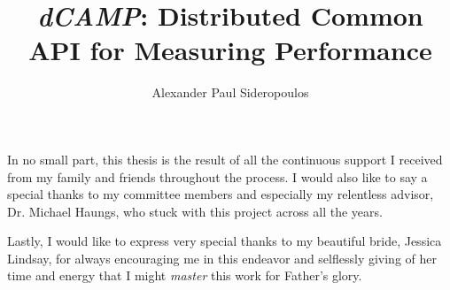 \documentclass[12pt]{ucthesis}
\newcommand{\dcampns}{\emph{dCAMP}}
\begin{document}

\title{\dcampns: Distributed Common API for Measuring Performance}
\author{Alexander Paul Sideropoulos}
  
 
     

\maketitle

\begin{frontmatter}

\copyrightpage

\committeemembershippage



\begin{acknowledgements}

In no small part, this thesis is the result of all the continuous support I received from my family and friends
throughout the process. I would also like to say a special thanks to my committee members and especially my relentless
advisor, Dr. Michael Haungs, who stuck with this project across all the years.

Lastly, I would like to express very special thanks to my beautiful bride, Jessica Lindsay, for always encouraging me in
this endeavor and selflessly giving of her time and energy that I might \textit{master} this work for Father's glory.

\end{acknowledgements}

\tableofcontents

\listoftables
\listoffigures

\end{frontmatter}

\pagestyle{plain}

\renewcommand{\baselinestretch}{1.66}










\clearpage




\appendix


\end{document}
